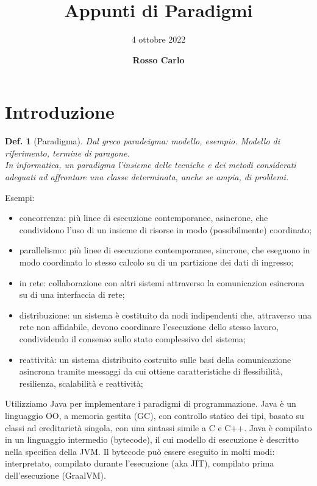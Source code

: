 \documentclass{article}
\title{\vspace{2cm}\textbf{Appunti di Paradigmi}}
\author{\vspace{3mm}4 ottobre 2022}
\date{\vspace{3mm} \textbf{Rosso Carlo}}
\newtheorem{definition}{Def.}[section]
\begin{document}
\begin{titlepage}
	\maketitle
	\thispagestyle{empty}
\end{titlepage}
\tableofcontents
\newpage

\section{Introduzione}
\begin{definition}[Paradigma]
	Dal greco \textit{paradeigma}: modello, esempio. Modello di riferimento,
	termine di paragone. \\
	In informatica, un paradigma l'insieme delle tecniche e dei metodi
	considerati adeguati ad affrontare una classe determinata, anche se ampia,
	di problemi.
\end{definition} 

Esempi:
\begin{itemize}
	\item concorrenza: più linee di esecuzione contemporanee, asincrone, che
		condividono l'uso di un insieme di risorse in modo (possibilmente)
		coordinato;

	\item parallelismo: più linee di esecuzione contemporanee, sincrone, che
		eseguono in modo coordinato lo stesso calcolo su di un partizione dei
		dati di ingresso;

	\item in rete: collaborazione con altri sistemi attraverso la comunicazion
		esincrona su di una interfaccia di rete;
	
	\item distribuzione: un sistema è costituito da nodi indipendenti che,
		attraverso una rete non affidabile, devono coordinare l'esecuzione dello
		stesso lavoro, condividendo il consenso sullo stato complessivo del
		sistema;

	\item reattività: un sistema distribuito costruito sulle basi della
		comunicazione asincrona tramite messaggi da cui ottiene caratteristiche
		di flessibilità, resilienza, scalabilità e reattività;
\end{itemize}

Utilizziamo Java per implementare i paradigmi di programmazione.
Java è un linguaggio OO, a memoria gestita (GC), con controllo statico dei tipi,
basato su classi ad ereditarietà singola, con una sintassi simile a C e C++.
Java è compilato in un linguaggio intermedio (bytecode), il cui modello di
esecuzione è descritto nella specifica della JVM.
Il bytecode può essere eseguito in molti modi: interpretato, compilato durante
l'esecuzione (aka JIT), compilato prima dell'esecuzione (GraalVM).
\end{document}
